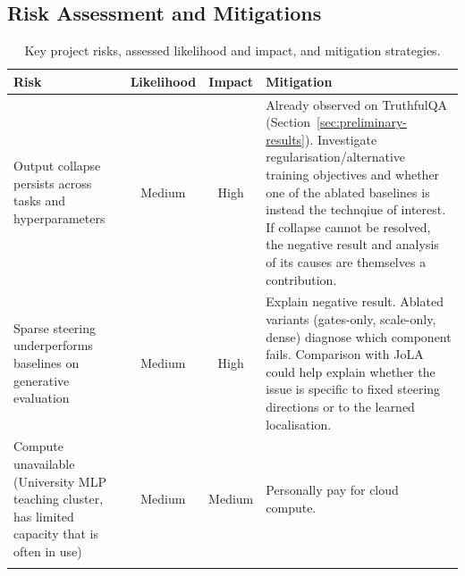 \subsection{Risk Assessment and Mitigations}

\begin{table}[!ht]
\centering
\small
\begin{tabular}{@{}p{3.8cm}ccp{5.2cm}@{}}
\toprule
\textbf{Risk} & \textbf{Likelihood} & \textbf{Impact} & \textbf{Mitigation} \\
\midrule
Output collapse persists across tasks and hyperparameters &
Medium & High &
Already observed on TruthfulQA (Section~\ref{sec:preliminary-results}). Investigate regularisation/alternative training objectives and whether one of the ablated baselines is instead the technqiue of interest. If collapse cannot be resolved, the negative result and analysis of its causes are themselves a contribution. \\
\addlinespace
Sparse steering underperforms baselines on generative evaluation &
Medium & High &
Explain negative result. Ablated variants (gates-only, scale-only, dense) diagnose which component fails. Comparison with JoLA could help explain whether the issue is specific to fixed steering directions or to the learned localisation. \\
\addlinespace
Compute unavailable (University MLP teaching cluster, has limited capacity that is often in use) &
Medium & Medium &
Personally pay for cloud compute. \\
\addlinespace
\bottomrule
\end{tabular}
\caption{Key project risks, assessed likelihood and impact, and mitigation strategies.}
\label{tab:risks}
\end{table}

